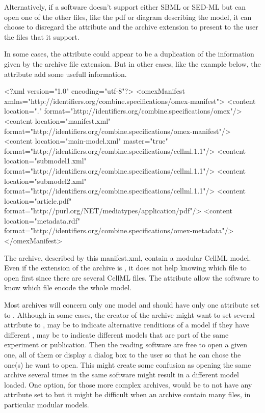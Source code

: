 Alternatively, if a software doesn't support either SBML or SED-ML but can open one of the other files, like the pdf
or diagram describing the model, it can choose to disregard the  attribute and the archive extension to present to the user the
files that it support.

In some cases, the  attribute could appear to be a duplication of the information given by the archive file
extension. But in other cases, like the example below, the  attribute add some usefull information.


\begin{example}
<?xml version="1.0" encoding="utf-8"?>
<omexManifest xmlns="http://identifiers.org/combine.specifications/omex-manifest">
    <content location="." format="http://identifiers.org/combine.specifications/omex"/>
    <content location="manifest.xml" 
        format="http://identifiers.org/combine.specifications/omex-manifest"/>
    <content location="main-model.xml" master="true"
        format="http://identifiers.org/combine.specifications/cellml.1.1"/>
    <content location="submodel1.xml" 
        format="http://identifiers.org/combine.specifications/cellml.1.1"/>
    <content location="submodel2.xml" 
        format="http://identifiers.org/combine.specifications/cellml.1.1"/>
    <content location="article.pdf" format="http://purl.org/NET/mediatypes/application/pdf"/>
    <content location="metadata.rdf"
        format="http://identifiers.org/combine.specifications/omex-metadata"/>
</omexManifest>
\end{example}

The archive, described by this manifest.xml, contain a modular CellML model. Even if the extension of the archive is , it
does not help knowing which file to open first since there are several CellML files. The  attribute allow the software
to know which file encode the whole model.

Most archives will concern only one model and should have only one  attribute set to . Although in some cases, the creator of the archive might want to set several  attribute to , may be to indicate alternative renditions of a model if they have different , may be to indicate different models that are part of the same experiment or publication. Then the reading software are free to open a given one, all of them or display a dialog box to the user so that he can chose the one(s) he want to open. This might create some confusion as opening the same archive several times in the same software might result in a different model loaded. One option, for those more complex archives, would be to not have any  attribute set to  but it might be difficult when an archive contain many files, in particular modular models.


